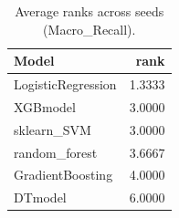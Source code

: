 \begin{table}[t]
\centering
\begin{tabular}{lr}
\toprule
Model & rank \\
\midrule
LogisticRegression & 1.3333 \\
XGBmodel & 3.0000 \\
sklearn_SVM & 3.0000 \\
random_forest & 3.6667 \\
GradientBoosting & 4.0000 \\
DTmodel & 6.0000 \\
\bottomrule
\end{tabular}
\caption{Average ranks across seeds (Macro_Recall).}
\label{tab:avg_rank_Macro_Recall}
\end{table}